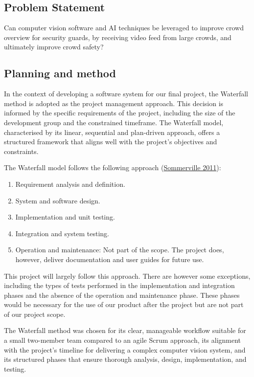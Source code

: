 \documentclass[
]{article}
\begin{document}
\hypertarget{sec-problem-statement}{%
\subsection{Problem Statement}\label{sec-problem-statement}}

Can computer vision software and AI techniques be leveraged to improve
crowd overview for security guards, by receiving video feed from large
crowds, and ultimately improve crowd safety?

\hypertarget{planning-and-method}{%
\subsection{Planning and method}\label{planning-and-method}}

In the context of developing a software system for our final project,
the Waterfall method is adopted as the project management approach. This
decision is informed by the specific requirements of the project,
including the size of the development group and the constrained
timeframe. The Waterfall model, characterised by its linear, sequential
and plan-driven approach, offers a structured framework that aligns well
with the project's objectives and constraints.

The Waterfall model follows the following approach
(\protect\hyperlink{ref-sommerville2011software}{Sommerville 2011}):

\begin{enumerate}
\def\labelenumi{\arabic{enumi}.}
\item
  Requirement analysis and definition.
\item
  System and software design.
\item
  Implementation and unit testing.
\item
  Integration and system testing.
\item
  Operation and maintenance: Not part of the scope. The project does,
  however, deliver documentation and user guides for future use.
\end{enumerate}

This project will largely follow this approach. There are however some
exceptions, including the types of tests performed in the implementation
and integration phases and the absence of the operation and maintenance
phase. These phases would be necessary for the use of our product after
the project but are not part of our project scope.

The Waterfall method was chosen for its clear, manageable workflow
suitable for a small two-member team compared to an agile Scrum
approach, its alignment with the project's timeline for delivering a
complex computer vision system, and its structured phases that ensure
thorough analysis, design, implementation, and testing.
\end{document}

